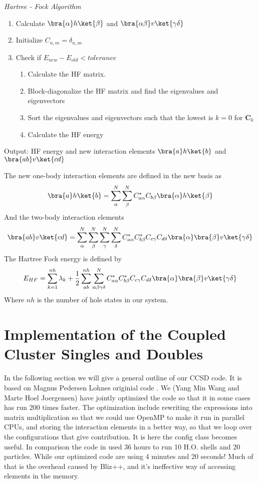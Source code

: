 \begin{algorithm}
\caption{\emph{Hartree - Fock Algorithm}}
\begin{enumerate}[1.]
\item Calculate $\bra{\alpha}h\ket{\beta}$ and $\bra{\alpha\beta}v\ket{\gamma\delta}$
\item Initialize $C_{n,m} = \delta_{n,m}$
\item Check if $E_{new} - E_{old} < tolerance$
\begin{enumerate}[1.]
\item Calculate the HF matrix.
\item Block-diagonalize the HF matrix and find the eigenvalues and eigenvectors
\item Sort the eigenvalues and eigenvectors such that the lowest is $k=0$ for $\mathbf{C}_k$
\item Calculate the HF energy
\end{enumerate}
\end{enumerate}
Output: HF energy and new interaction elements $\bra{a}h\ket{b}$ and $\bra{ab}v\ket{cd}$
\end{algorithm}
%
The new one-body interaction elements are defined in the new basis as
%
\begin{equation}
 \bra{a}h\ket{b} = \sum_{\alpha}^N\sum_{\beta}^N C_{a\alpha}^*C_{b\beta} \bra{\alpha}h\ket{\beta}
\end{equation}
%
And the two-body interaction elements
%
\begin{equation}
 \bra{ab}v\ket{cd} = \sum_{\alpha}^N\sum_{\beta}^N\sum_{\gamma}^N\sum_{\delta}^N C_{a\alpha}^*C_{b\beta}^* C_{c\gamma}C_{d\delta}  \bra{\alpha}\bra{\beta}v\ket{\gamma\delta}
\end{equation}
%
The Hartree Fock energy is defined by
%
\begin{equation}
  E_{HF} = \sum_{k=1}^{nh} \lambda_k + \frac{1}{2} \sum_{ab}^{nh}\sum_{\alpha\beta\gamma\delta}^N  C_{a\alpha}^*C_{b\beta}^* C_{c\gamma}C_{d\delta}  \bra{\alpha}\bra{\beta}v\ket{\gamma\delta}
\end{equation}
% 
Where $nh$ is the number of hole states in our system.


\section{Implementation of the Coupled Cluster Singles and Doubles}
In the following section we will give a general outline of our CCSD code. It is based on Magnus Pedersen Lohnes originial code \cite{lohne}. We (Yang Min Wang and Marte Hoel Joergensen) have jointly optimized the code so that it in some cases has run 200 times faster. The optimization include rewriting the expressions into matrix multiplication so that we could use OpenMP to make it run in parallel CPUs, and storing the interaction elements in a better way, so that we loop over the configurations that give contribution. It is here the config class becomes useful. In comparison the code in \cite{lohne} used 36 hours to run 10 H.O. shells and 20 particles. While our optimized code are using 4 minutes and 20 seconds! Much of that is the overhead caused by Bliz++, and it's ineffective way of accessing elements in the memory.  

